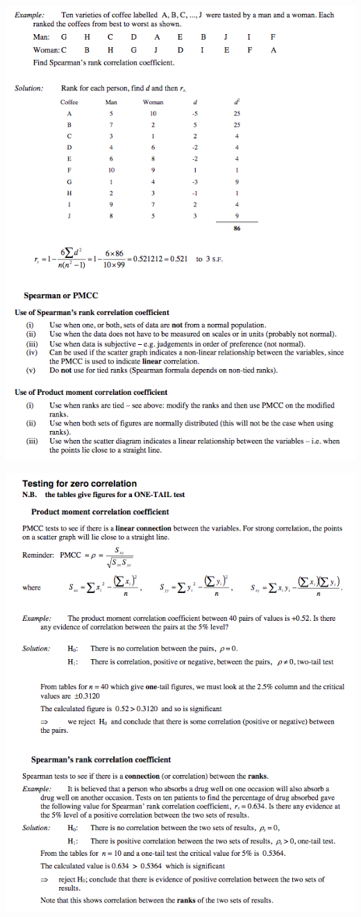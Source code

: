 \documentclass[a4paper]{article}
\begin{document}
\begin{center}
	\includegraphics[scale=0.5]{img_S/20_eg2}
\end{center}
\begin{center}
	\includegraphics[scale=0.5]{img_S/20_eg3}
\end{center}
\end{document}
